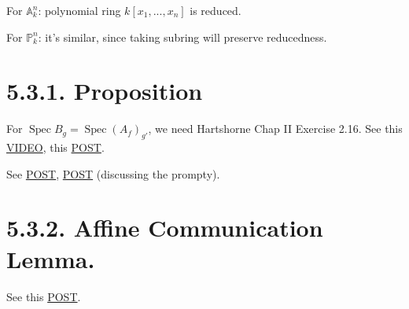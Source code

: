 For $\mathbb A^n_k$: 
polynomial ring $k[x_1,...,x_n]$ is reduced.

For $\mathbb P^n_k$: it's similar, since taking subring will preserve reducedness.

\section{5.3.1. Proposition}

For $\operatorname{Spec} B_g=\operatorname{Spec}(A_f)_{g'}$, we need \cite{hartshorne2013algebraic} Hartshorne Chap II Exercise 2.16. See this \href{https://youtu.be/EWnhf0BdAWA?si=zMjtGhr12HSCjzNr}{VIDEO}, this \href{https://math.stackexchange.com/questions/384137/intersection-of-open-affines-can-be-covered-by-open-sets-distinguished-in-both}{POST}.

See \href{http://mathbabysteps.blogspot.com/2016/12/affine-communication-lemma.html}{POST}, \href{https://math.stackexchange.com/questions/4146296/declaremathoperator-specspecdoubt-about-nikes-lemma-about-the-intersecti}{POST} (discussing the prompty).

\section{5.3.2. Affine Communication Lemma.}

See this \href{http://mathbabysteps.blogspot.com/2016/12/affine-communication-lemma.html}{POST}.